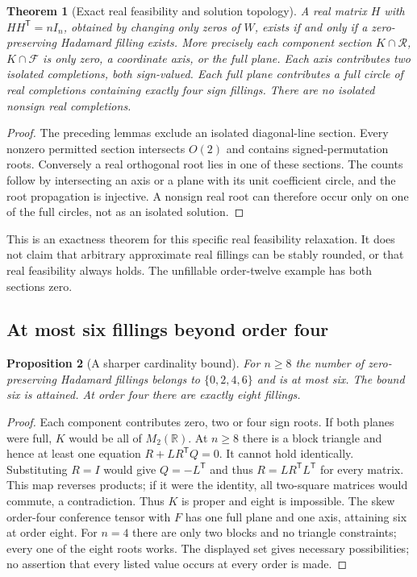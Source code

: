 \documentclass[11pt]{article}
\newtheorem{theorem}{Theorem}[section]
\newtheorem{proposition}[theorem]{Proposition}
\begin{document}
\begin{theorem}[Exact real feasibility and solution topology]
A real matrix $H$ with $HH^{\mathsf T}=nI_n$, obtained by changing
only zeros of $W$, exists if and only if a zero-preserving Hadamard
filling exists. More precisely each component section
$K\cap\mathcal R$, $K\cap\mathcal F$ is only zero, a coordinate
axis, or the full plane. Each axis contributes two isolated
completions, both sign-valued. Each full plane contributes a full
circle of real completions containing exactly four sign fillings.
There are no isolated nonsign real completions.
\end{theorem}
\begin{proof}
The preceding lemmas exclude an isolated diagonal-line section.
Every nonzero permitted section intersects $O(2)$ and contains
signed-permutation roots. Conversely a real orthogonal root lies
in one of these sections. The counts follow by intersecting an
axis or a plane with its unit coefficient circle, and the root
propagation is injective. A nonsign real root can therefore occur
only on one of the full circles, not as an isolated solution.
\end{proof}

This is an exactness theorem for this specific real feasibility
relaxation. It does not claim that arbitrary approximate real
fillings can be stably rounded, or that real feasibility always
holds. The unfillable order-twelve example has both sections zero.

\subsection{At most six fillings beyond order four}
\begin{proposition}[A sharper cardinality bound]
For $n\ge8$ the number of zero-preserving Hadamard fillings belongs
to $\{0,2,4,6\}$ and is at most six. The bound six is attained.
At order four there are exactly eight fillings.
\end{proposition}
\begin{proof}
Each component contributes zero, two or four sign roots. If both
planes were full, $K$ would be all of $M_2(\mathbb R)$. At $n\ge8$
there is a block triangle and hence at least one equation
$R+LR^{\mathsf T}Q=0$. It cannot hold identically. Substituting
$R=I$ would give $Q=-L^{\mathsf T}$ and thus
$R=LR^{\mathsf T}L^{\mathsf T}$ for every matrix. This map reverses
products; if it were the identity, all two-square matrices would
commute, a contradiction. Thus $K$ is proper and eight is impossible.
The skew order-four conference tensor with $F$ has one full plane
and one axis, attaining six at order eight. For $n=4$ there are
only two blocks and no triangle constraints; every one of the
eight roots works. The displayed set gives necessary possibilities;
no assertion that every listed value occurs at every order is made.
\end{proof}
\end{document}
